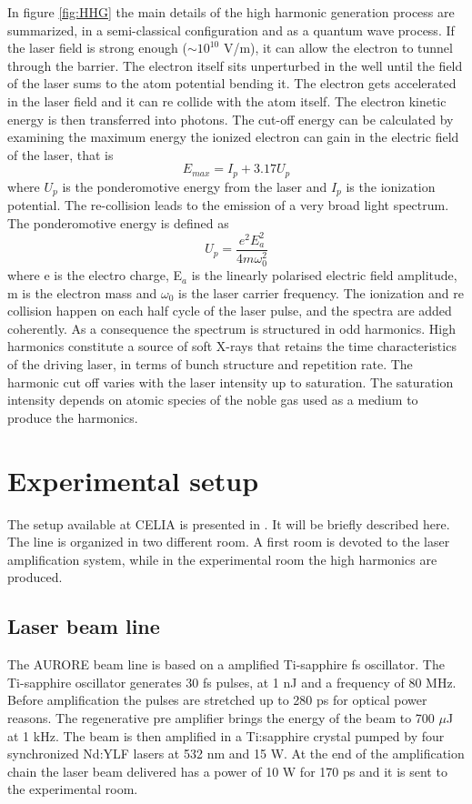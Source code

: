 In figure \ref{fig:HHG} the main details of the high harmonic generation process are summarized, in a semi-classical configuration and as a quantum wave process.
If the laser field is strong enough ($\sim 10^{10}$ V/m), it can allow the electron to tunnel through the barrier. The electron itself sits unperturbed in the well until the field of the laser sums to the atom potential bending it.
The electron gets accelerated in the laser field and it can re collide with the atom itself. The electron kinetic energy is then transferred into photons.
The cut-off energy can be calculated by examining the maximum energy the ionized electron can gain in the electric field of the laser, that is
\begin{equation}
E_{max} = I_{p}+3.17U_{p}
\end{equation}
where $U_{p}$ is the ponderomotive energy from the laser and $I_{p}$ is the ionization potential. The re-collision leads to the emission of a very broad light spectrum. The ponderomotive energy is defined as
\begin{equation}
U_{p} = \frac{e^{2}E_{a}^{2}}{4m\omega _{0}^{2}}
\end{equation}
where e is the electro charge, E$_{a}$ is the linearly polarised electric field amplitude, m is the electron mass and $\omega _{0}$ is the laser carrier frequency.
The ionization and re collision happen on each half cycle of the laser pulse, and the spectra are added coherently. As a consequence the spectrum is structured in odd harmonics.
High harmonics constitute a source of soft X-rays that retains the time characteristics of the driving laser, in terms of bunch structure and repetition rate. 
The harmonic cut off varies with the laser intensity up to saturation. The saturation intensity depends on atomic species of the noble gas used as a medium to produce the harmonics.

\section{Experimental setup}
The setup available at CELIA is presented in \cite{Martin2001}. It will be briefly described here. The line is organized in two different room. A first room is devoted to the laser amplification system, while in the experimental room the high harmonics are produced.
\subsection{Laser beam line}
The AURORE beam line is based on a amplified Ti-sapphire fs oscillator. 
The Ti-sapphire oscillator generates 30 fs pulses, at 1 nJ and a frequency of 80 MHz. Before amplification the pulses are stretched up to 280 ps for optical power reasons.
The regenerative pre amplifier brings the energy of the beam to 700 $\mu$J at 1 kHz.
The beam is then amplified in a Ti:sapphire crystal pumped by four synchronized Nd:YLF lasers at 532 nm and 15 W.
At the end of the amplification chain the laser beam delivered has a power of 10 W for 170 ps and it is sent to the experimental room.
